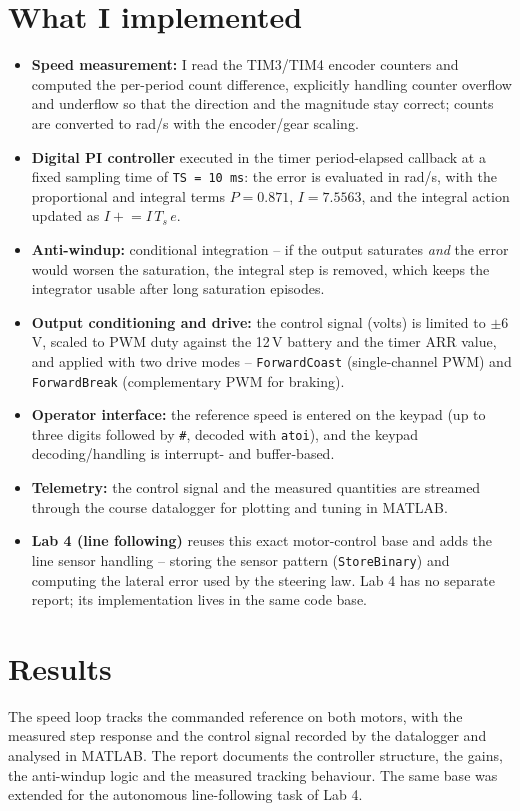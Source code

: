 \documentclass[10pt,a4paper]{article}
\begin{document}
\section*{What I implemented}
\begin{itemize}
  \item \textbf{Speed measurement:} I read the TIM3/TIM4 encoder counters and computed the per-period count
        difference, explicitly handling counter overflow and underflow so that the direction and the magnitude stay
        correct; counts are converted to rad/s with the encoder/gear scaling.
  \item \textbf{Digital PI controller} executed in the timer period-elapsed callback at a fixed sampling time of
        \texttt{TS = 10\,ms}: the error is evaluated in rad/s, with the proportional and integral terms
        $P=0.871$, $I=7.5563$, and the integral action updated as $I \mathrel{+}= I\,T_s\,e$.
  \item \textbf{Anti-windup:} conditional integration -- if the output saturates \emph{and} the error would worsen the
        saturation, the integral step is removed, which keeps the integrator usable after long saturation episodes.
  \item \textbf{Output conditioning and drive:} the control signal (volts) is limited to $\pm6$\,V, scaled to PWM duty
        against the 12\,V battery and the timer ARR value, and applied with two drive modes --
        \texttt{ForwardCoast} (single-channel PWM) and \texttt{ForwardBreak} (complementary PWM for braking).
  \item \textbf{Operator interface:} the reference speed is entered on the keypad (up to three digits followed by
        \texttt{\#}, decoded with \texttt{atoi}), and the keypad decoding/handling is interrupt- and buffer-based.
  \item \textbf{Telemetry:} the control signal and the measured quantities are streamed through the course datalogger
        for plotting and tuning in MATLAB.
  \item \textbf{Lab 4 (line following)} reuses this exact motor-control base and adds the line sensor handling --
        storing the sensor pattern (\texttt{StoreBinary}) and computing the lateral error used by the steering law.
        Lab 4 has no separate report; its implementation lives in the same code base.
\end{itemize}

\section*{Results}
The speed loop tracks the commanded reference on both motors, with the measured step response and the control signal
recorded by the datalogger and analysed in MATLAB. The report documents the controller structure, the gains, the
anti-windup logic and the measured tracking behaviour. The same base was extended for the autonomous line-following
task of Lab 4.
\end{document}
